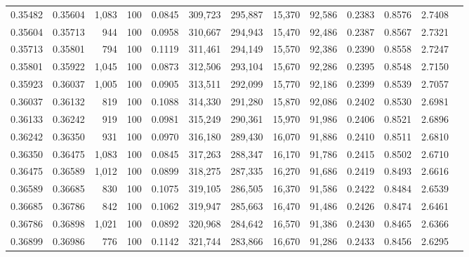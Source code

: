\begin{tabular}{rrrrrrrrrrrrr}
0.35482 & 0.35604 & 1,083 & 100 &                                     0.0845 & 309,723 & 295,887 &  15,370 &  92,586 & 0.2383 & 0.8576 & 2.7408 \\
0.35604 & 0.35713 &   944 & 100 &                                     0.0958 & 310,667 & 294,943 &  15,470 &  92,486 & 0.2387 & 0.8567 & 2.7321 \\
0.35713 & 0.35801 &   794 & 100 &                                     0.1119 & 311,461 & 294,149 &  15,570 &  92,386 & 0.2390 & 0.8558 & 2.7247 \\
0.35801 & 0.35922 & 1,045 & 100 &                                     0.0873 & 312,506 & 293,104 &  15,670 &  92,286 & 0.2395 & 0.8548 & 2.7150 \\
0.35923 & 0.36037 & 1,005 & 100 &                                     0.0905 & 313,511 & 292,099 &  15,770 &  92,186 & 0.2399 & 0.8539 & 2.7057 \\
0.36037 & 0.36132 &   819 & 100 &                                     0.1088 & 314,330 & 291,280 &  15,870 &  92,086 & 0.2402 & 0.8530 & 2.6981 \\
0.36133 & 0.36242 &   919 & 100 &                                     0.0981 & 315,249 & 290,361 &  15,970 &  91,986 & 0.2406 & 0.8521 & 2.6896 \\
0.36242 & 0.36350 &   931 & 100 &                                     0.0970 & 316,180 & 289,430 &  16,070 &  91,886 & 0.2410 & 0.8511 & 2.6810 \\
0.36350 & 0.36475 & 1,083 & 100 &                                     0.0845 & 317,263 & 288,347 &  16,170 &  91,786 & 0.2415 & 0.8502 & 2.6710 \\
0.36475 & 0.36589 & 1,012 & 100 &                                     0.0899 & 318,275 & 287,335 &  16,270 &  91,686 & 0.2419 & 0.8493 & 2.6616 \\
0.36589 & 0.36685 &   830 & 100 &                                     0.1075 & 319,105 & 286,505 &  16,370 &  91,586 & 0.2422 & 0.8484 & 2.6539 \\
0.36685 & 0.36786 &   842 & 100 &                                     0.1062 & 319,947 & 285,663 &  16,470 &  91,486 & 0.2426 & 0.8474 & 2.6461 \\
0.36786 & 0.36898 & 1,021 & 100 &                                     0.0892 & 320,968 & 284,642 &  16,570 &  91,386 & 0.2430 & 0.8465 & 2.6366 \\
0.36899 & 0.36986 &   776 & 100 &                                     0.1142 & 321,744 & 283,866 &  16,670 &  91,286 & 0.2433 & 0.8456 & 2.6295 \\

\end{tabular}
